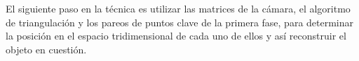 El siguiente paso en la t\'{e}cnica es utilizar las matrices de la c\'{a}mara, el algoritmo de triangulaci\'{o}n y los pareos de puntos clave de la primera fase, para determinar la posici\'{o}n en el espacio tridimensional de cada uno de ellos y as\'{i} reconstruir el objeto en cuesti\'{o}n.






